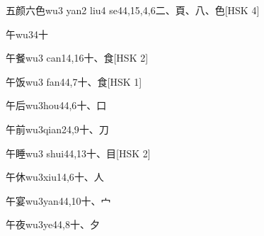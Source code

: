 \begin{EntryWithPhonetic}{五颜六色}{wu3 yan2 liu4 se4}{4,15,4,6}{⼆、⾴、⼋、⾊}[HSK 4]
\end{EntryWithPhonetic}

\begin{EntryWithPhonetic}{午}{wu3}{4}{⼗}
\end{EntryWithPhonetic}

\begin{EntryWithPhonetic}{午餐}{wu3 can1}{4,16}{⼗、⾷}[HSK 2]
\end{EntryWithPhonetic}

\begin{EntryWithPhonetic}{午饭}{wu3 fan4}{4,7}{⼗、⾷}[HSK 1]
\end{EntryWithPhonetic}

\begin{EntryWithPhonetic}{午后}{wu3hou4}{4,6}{⼗、⼝}
\end{EntryWithPhonetic}

\begin{EntryWithPhonetic}{午前}{wu3qian2}{4,9}{⼗、⼑}
\end{EntryWithPhonetic}

\begin{EntryWithPhonetic}{午睡}{wu3 shui4}{4,13}{⼗、⽬}[HSK 2]
\end{EntryWithPhonetic}

\begin{EntryWithPhonetic}{午休}{wu3xiu1}{4,6}{⼗、⼈}
\end{EntryWithPhonetic}

\begin{EntryWithPhonetic}{午宴}{wu3yan4}{4,10}{⼗、⼧}
\end{EntryWithPhonetic}

\begin{EntryWithPhonetic}{午夜}{wu3ye4}{4,8}{⼗、⼣}
\end{EntryWithPhonetic}

